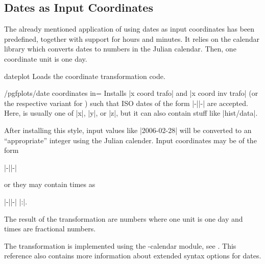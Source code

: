 \subsection{Dates as Input Coordinates}
\label{pgfplots:sec:date:coords}

{
\def\pgfplotsmanualcurlibrary{dateplot}

The already mentioned application of using dates as input coordinates has been
predefined, together with support for hours and minutes. It relies on the
\pgfname{} calendar library which converts dates to numbers in the Julian
calendar. Then, one coordinate unit is one day.

\begin{pgfplotslibrary}{dateplot}
    Loads the coordinate transformation code.
\end{pgfplotslibrary}

\begin{stylekey}{/pgfplots/date coordinates in=}
    Installs |x coord trafo| and |x coord inv trafo| (or the respective variant
    for ) such that ISO dates of the form
    |-||-| are accepted. Here,
     is usually one of |x|, |y|, or |z|, but it can also
    contain stuff like |hist/data|.

    After installing this style, input values like |2006-02-28| will be
    converted to an ``appropriate'' integer using the Julian calender. Input
    coordinates may be of the form

        |-||-|

    \noindent or they may contain times as

        |-||-| |:|.

    The result of the transformation are numbers where one unit is one day and
    times are fractional numbers.

    The transformation is implemented using the \pgfname-calendar module, see
    \cite[Calendar Library]{tikz}. This reference also contains more
    information about extended syntax options for dates.


\end{stylekey}}
